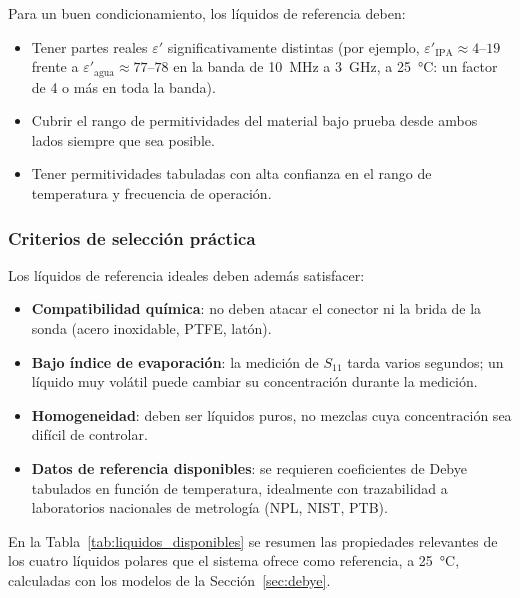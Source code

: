 Para un buen condicionamiento, los líquidos de referencia deben:
\begin{itemize}
    \item Tener partes reales $\varepsilon'$ significativamente distintas
          (por ejemplo, $\varepsilon'_{\text{IPA}} \approx 4$--$19$ frente a
          $\varepsilon'_{\text{agua}} \approx 77$--$78$ en la banda de 10~MHz a
          3~GHz, a 25~°C: un factor de 4 o más en toda la banda).
    \item Cubrir el rango de permitividades del material bajo prueba desde ambos lados
          siempre que sea posible.
    \item Tener permitividades tabuladas con alta confianza en el rango de temperatura
          y frecuencia de operación.
\end{itemize}

\subsubsection{Criterios de selección práctica}

Los líquidos de referencia ideales deben además satisfacer:
\begin{itemize}
    \item \textbf{Compatibilidad química}: no deben atacar el conector ni la
          brida de la sonda (acero inoxidable, PTFE, latón).
    \item \textbf{Bajo índice de evaporación}: la medición de $S_{11}$ tarda
          varios segundos; un líquido muy volátil puede cambiar su concentración
          durante la medición.
    \item \textbf{Homogeneidad}: deben ser líquidos puros, no mezclas cuya
          concentración sea difícil de controlar.
    \item \textbf{Datos de referencia disponibles}: se requieren coeficientes de Debye
          tabulados en función de temperatura, idealmente con trazabilidad a
          laboratorios nacionales de metrología (NPL, NIST, PTB).
\end{itemize}

En la Tabla~\ref{tab:liquidos_disponibles} se resumen las propiedades relevantes
de los cuatro líquidos polares que el sistema ofrece como referencia, a 25~°C,
calculadas con los modelos de la Sección~\ref{sec:debye}.


